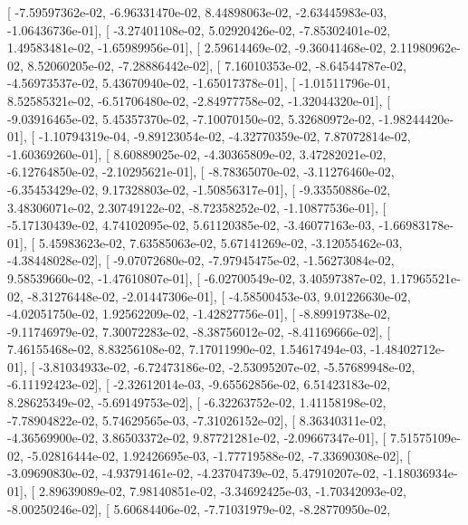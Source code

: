\documentclass{article}
\begin{document}
       [ -7.59597362e-02,  -6.96331470e-02,   8.44898063e-02,
         -2.63445983e-03,  -1.06436736e-01],
       [ -3.27401108e-02,   5.02920426e-02,  -7.85302401e-02,
          1.49583481e-02,  -1.65989956e-01],
       [  2.59614469e-02,  -9.36041468e-02,   2.11980962e-02,
          8.52060205e-02,  -7.28886442e-02],
       [  7.16010353e-02,  -8.64544787e-02,  -4.56973537e-02,
          5.43670940e-02,  -1.65017378e-01],
       [ -1.01511796e-01,   8.52585321e-02,  -6.51706480e-02,
         -2.84977758e-02,  -1.32044320e-01],
       [ -9.03916465e-02,   5.45357370e-02,  -7.10070150e-02,
          5.32680972e-02,  -1.98244420e-01],
       [ -1.10794319e-04,  -9.89123054e-02,  -4.32770359e-02,
          7.87072814e-02,  -1.60369260e-01],
       [  8.60889025e-02,  -4.30365809e-02,   3.47282021e-02,
         -6.12764850e-02,  -2.10295621e-01],
       [ -8.78365070e-02,  -3.11276460e-02,  -6.35453429e-02,
          9.17328803e-02,  -1.50856317e-01],
       [ -9.33550886e-02,   3.48306071e-02,   2.30749122e-02,
         -8.72358252e-02,  -1.10877536e-01],
       [ -5.17130439e-02,   4.74102095e-02,   5.61120385e-02,
         -3.46077163e-03,  -1.66983178e-01],
       [  5.45983623e-02,   7.63585063e-02,   5.67141269e-02,
         -3.12055462e-03,  -4.38448028e-02],
       [ -9.07072680e-02,  -7.97945475e-02,  -1.56273084e-02,
          9.58539660e-02,  -1.47610807e-01],
       [ -6.02700549e-02,   3.40597387e-02,   1.17965521e-02,
         -8.31276448e-02,  -2.01447306e-01],
       [ -4.58500453e-03,   9.01226630e-02,  -4.02051750e-02,
          1.92562209e-02,  -1.42827756e-01],
       [ -8.89919738e-02,  -9.11746979e-02,   7.30072283e-02,
         -8.38756012e-02,  -8.41169666e-02],
       [  7.46155468e-02,   8.83256108e-02,   7.17011990e-02,
          1.54617494e-03,  -1.48402712e-01],
       [ -3.81034933e-02,  -6.72473186e-02,  -2.53095207e-02,
         -5.57689948e-02,  -6.11192423e-02],
       [ -2.32612014e-03,  -9.65562856e-02,   6.51423183e-02,
          8.28625349e-02,  -5.69149753e-02],
       [ -6.32263752e-02,   1.41158198e-02,  -7.78904822e-02,
          5.74629565e-03,  -7.31026152e-02],
       [  8.36340311e-02,  -4.36569900e-02,   3.86503372e-02,
          9.87721281e-02,  -2.09667347e-01],
       [  7.51575109e-02,  -5.02816444e-02,   1.92426695e-03,
         -1.77719588e-02,  -7.33690308e-02],
       [ -3.09690830e-02,  -4.93791461e-02,  -4.23704739e-02,
          5.47910207e-02,  -1.18036934e-01],
       [  2.89639089e-02,   7.98140851e-02,  -3.34692425e-03,
         -1.70342093e-02,  -8.00250246e-02],
       [  5.60684406e-02,  -7.71031979e-02,  -8.28770950e-02,
\end{document}
